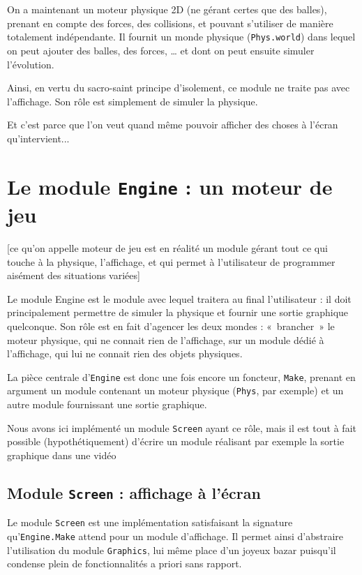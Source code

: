 \documentclass[a4paper]{scrartcl}
\begin{document}
\section*{}
On a maintenant un moteur physique 2D (ne gérant certes que des
balles), prenant en compte des forces, des collisions, et pouvant
s'utiliser de manière totalement indépendante. Il fournit un monde
physique (\texttt{Phys.world}) dans lequel on peut ajouter des balles,
des forces, … et dont on peut ensuite simuler l'évolution.

Ainsi, en vertu du sacro-saint principe d'isolement, ce module ne
traite pas avec l'affichage. Son rôle est simplement de simuler la
physique.

Et c'est parce que l'on veut quand même pouvoir afficher des choses à
l'écran qu'intervient...

\section{Le module \texttt{Engine} : un moteur de jeu}

[ce qu'on appelle moteur de jeu est en réalité un module gérant tout
ce qui touche à la physique, l'affichage, et qui permet à
l'utilisateur de programmer aisément des situations variées]



Le module Engine est le module avec lequel traitera au final
l'utilisateur : il doit principalement permettre de simuler la
physique et fournir une sortie graphique quelconque. Son rôle est en
fait d'agencer les deux mondes : «~brancher~» le moteur physique, qui
ne connait rien de l'affichage, sur un module dédié à l'affichage, qui
lui ne connait rien des objets physiques.

La pièce centrale d'\texttt{Engine} est donc une fois encore un
foncteur, \texttt{Make}, prenant en argument un module contenant un
moteur physique (\texttt{Phys}, par exemple) et un autre module
fournissant une sortie graphique.

Nous avons ici implémenté un module \texttt{Screen} ayant ce rôle,
mais il est tout à fait possible (hypothétiquement) d'écrire un module
réalisant par exemple la sortie graphique dans une vidéo

\subsection{Module \texttt{Screen} : affichage à l'écran}
Le module \texttt{Screen} est une implémentation satisfaisant la
signature qu'\texttt{Engine.Make} attend pour un module
d'affichage. Il permet ainsi d'abstraire l'utilisation du module
\texttt{Graphics}, lui même place d'un joyeux bazar puisqu'il condense
plein de fonctionnalités a priori sans rapport.
\end{document}
